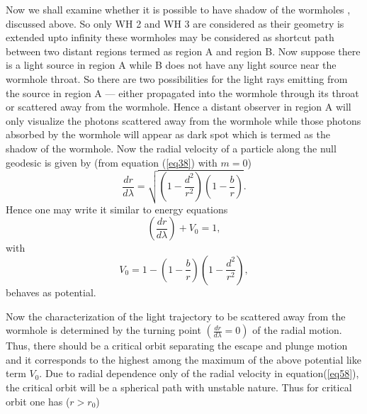 \documentclass[10pt]{revtex4}
\begin{document}
Now we shall examine whether it is possible to have shadow of the wormholes \cite{r25}, \cite{r27} discussed above. So only WH 2 and WH 3 are considered as their geometry is extended upto infinity  these wormholes may be considered as shortcut path between two distant regions termed as region A and region B. Now suppose there is a light source in region A while B does not have any light source near the wormhole throat. So there are two possibilities for the light rays emitting from the source in region A --- either propagated into the wormhole through its throat or scattered away from the wormhole. Hence a distant observer in region A will only visualize the photons scattered away from the wormhole while those photons absorbed by the wormhole will appear as dark spot which is termed as the shadow of the wormhole. Now the radial velocity of a particle along the null geodesic is given by (from equation (\ref{eq38}) with $m=0$) 
 \begin{equation}\label{eq58}
 \frac{dr}{d\lambda}=\sqrt{\left(1-\frac{d^2}{r^2}\right)\left(1-\frac{b}{r}\right)}.
 \end{equation}
 Hence one may write it similar to energy equations
 \begin{equation}
 \left(\frac{dr}{d\lambda}\right)+V_0=1,
 \end{equation}
 with 
 \begin{equation}
 V_0=1-\left(1-\frac{b}{r}\right)\left(1-\frac{d^2}{r^2}\right),
 \end{equation}
 behaves as potential.
 \par
Now the characterization of the light trajectory\cite{r28} to be scattered away from the wormhole is determined by the turning point $\left(\frac{dr}{d\lambda}=0\right)$ of the radial motion. Thus, there should be a critical orbit separating the escape and plunge motion and it corresponds to the highest among the maximum of the above potential like term $V_0$. Due to radial dependence only of the radial velocity in equation(\ref{eq58}), the critical orbit will be a spherical path with unstable nature. Thus for critical orbit one has ($r>r_0$) 
\end{document}
